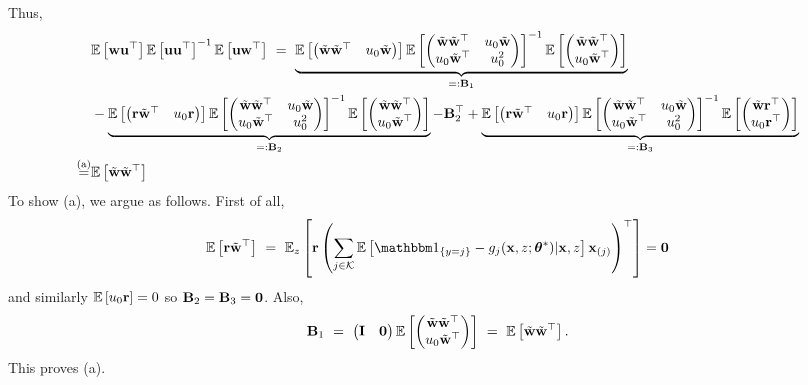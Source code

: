 Thus, 
\begin{align*}
    &\mathbb{E}\left[\mathbf{w} \mathbf{u}^{\top} \right]\mathbb{E}\left[\mathbf{u} \mathbf{u}^{\top} \right]^{-1}\mathbb{E}\left[\mathbf{u} \mathbf{w}^{\top}\right]~=~
    \underbrace{\mathbb{E}\left[\begin{pmatrix}
    \tilde{\mathbf{w}}\tilde{\mathbf{w}}^{\top} & u_0\tilde{\mathbf{w}}   
 \end{pmatrix} \right]
 \mathbb{E}\left[
 \begin{pmatrix}
    \tilde{\mathbf{w}}\tilde{\mathbf{w}}^{\top} & u_0\tilde{\mathbf{w}}\\
    u_0\tilde{\mathbf{w}}^{\top} & u_0^2
\end{pmatrix}\right]^{-1}
\mathbb{E}\left[\begin{pmatrix}
    \tilde{\mathbf{w}}\tilde{\mathbf{w}}^{\top} \\ u_0\tilde{\mathbf{w}}^{\top}  
 \end{pmatrix} \right]}_{=:\mathbf{B}_1}\\
 &-\underbrace{\mathbb{E}\left[\begin{pmatrix}
    \mathbf{r}\tilde{\mathbf{w}}^{\top} & u_0\mathbf{r}  
 \end{pmatrix} \right]
 \mathbb{E}\left[
 \begin{pmatrix}
    \tilde{\mathbf{w}}\tilde{\mathbf{w}}^{\top} & u_0\tilde{\mathbf{w}}\\
    u_0\tilde{\mathbf{w}}^{\top} & u_0^2
\end{pmatrix}\right]^{-1}
\mathbb{E}\left[\begin{pmatrix}
    \tilde{\mathbf{w}}\tilde{\mathbf{w}}^{\top} \\ u_0\tilde{\mathbf{w}}^{\top}  
 \end{pmatrix} \right]}_{=:\mathbf{B}_2} - \mathbf{B}_2^{\top} +
 \underbrace{\mathbb{E}\left[\begin{pmatrix}
    \mathbf{r}\tilde{\mathbf{w}}^{\top} & u_0\mathbf{r}  
 \end{pmatrix} \right]
 \mathbb{E}\left[
 \begin{pmatrix}
    \tilde{\mathbf{w}}\tilde{\mathbf{w}}^{\top} & u_0\tilde{\mathbf{w}}\\
    u_0\tilde{\mathbf{w}}^{\top} & u_0^2
\end{pmatrix}\right]^{-1}
\mathbb{E}\left[\begin{pmatrix}
    \tilde{\mathbf{w}}\mathbf{r}^{\top} \\ u_0\mathbf{r}^{\top}  
 \end{pmatrix} \right]}_{=:\mathbf{B}_3}\\
\stackrel{\text{(a)}}{=}&
\mathbb{E}\left[\tilde{\mathbf{w}}\tilde{\mathbf{w}}^{\top} \right]
\end{align*}
To show (a), we argue as follows.
First of all, 
$$
\E\left[
\rvec\tilde{\wvec}^{\top}\right]~=~
\E_{ z}\left[\rvec\left(\sum_{j\in \Kscr}
\E\left[\ind_{\{y = j\}} - g_{j}(\x, z; \thetavec^*)|\x, z
\right]\x_{(j)}\right)^{\top}
\right] = \Ovec
$$
and similarly $\mathbb{E}\left[
u_0\mathbf{r}\right] = 0$ so $\mathbf{B}_2 = \mathbf{B}_3 = \bm{0}$.
Also, 
$$
\mathbf{B}_1 ~=~ \begin{pmatrix}
  \mathbf{I} & \bm{0}   
\end{pmatrix}
\mathbb{E}\left[\begin{pmatrix}
    \tilde{\mathbf{w}}\tilde{\mathbf{w}}^{\top} \\ u_0\tilde{\mathbf{w}}^{\top}  
 \end{pmatrix} \right]
~=~\mathbb{E}\left[\tilde{\mathbf{w}}\tilde{\mathbf{w}}^{\top} \right].
$$
This proves (a).

